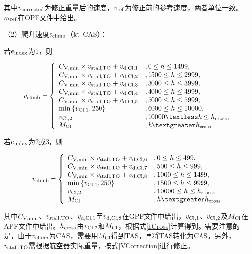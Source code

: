 \documentclass[a4paper,punct,space,heading=true,AutoFakeBold]{ctexrep}
\begin{document}
其中$v_{\rm corrected}$为修正重量后的速度，$v_{\rm ref}$为修正前的参考速度，两者单位一致。$m_{\rm ref}$在OPF文件中给出。


（2）爬升速度$v_{\rm climb}$（$\rm kt$ CAS）：

若$e_{\rm index}$为1，则

\begin{equation}
v_{\rm climb}=\left\{\begin{array}{ll}
C_{\rm V,min}\times v_{\rm stall,TO}+v_{\rm d,Cl,1}   &   , 0\leq h\leq 1499,\\
C_{\rm V,min}\times v_{\rm stall,TO}+v_{\rm d,Cl,2}   &   , 1500\leq h\leq 2999,\\
C_{\rm V,min}\times v_{\rm stall,TO}+v_{\rm d,Cl,3}   &   , 3000\leq h\leq 3999,\\
C_{\rm V,min}\times v_{\rm stall,TO}+v_{\rm d,Cl,4}   &   , 4000\leq h\leq 4999,\\
C_{\rm V,min}\times v_{\rm stall,TO}+v_{\rm d,Cl,5}   &   , 5000\leq h\leq 5999,\\
{\rm min}\left\{ v_{\rm Cl,1},250\right\}   &   , 6000\leq h\leq 10000,\\
v_{\rm Cl,2}   &   , 10000\textless h\leq h_{\rm cross},\\
M_{\rm Cl}   &   , h\textgreater h_{\rm cross}
\end{array}\right.
\end{equation}

若$e_{\rm index}$为2或3，则

\begin{equation}
v_{\rm climb}=\left\{\begin{array}{ll}
C_{\rm V,min}\times v_{\rm stall,TO}+v_{\rm d,Cl,6}   &   , 0\leq h\leq 499,\\
C_{\rm V,min}\times v_{\rm stall,TO}+v_{\rm d,Cl,7}   &   , 500\leq h\leq 999,\\
C_{\rm V,min}\times v_{\rm stall,TO}+v_{\rm d,Cl,8}   &   , 1000\leq h\leq 1499,\\
{\rm min}\left\{ v_{\rm Cl,1},250\right\}   &   , 1500\leq h\leq 9999,\\
v_{\rm Cl,2}   &   , 10000\leq h\leq h_{\rm cross},\\
M_{\rm Cl}   &   , h\textgreater h_{\rm cross}
\end{array}\right.
\end{equation}

其中$C_{\rm V,min}$、$v_{\rm stall,TO}$、$v_{\rm d,Cl,1}$至$v_{\rm d,Cl,8}$在GPF文件中给出，$v_{\rm Cl,1}$、$v_{\rm Cl,2}$及$M_{\rm Cl}$在APF文件中给出。$h_{\rm cross}$由$v_{\rm Cl,2}$和$M_{\rm Cl}$，根据式\ref{hCross}计算得到。需要注意的是，由于$v_{\rm climb}$为CAS，需要用$M_{\rm Cl}$得到TAS，再将TAS转化为CAS。另外，$v_{\rm stall,TO}$需根据航空器实际重量，按式\ref{VCorrection}进行修正。
\end{document}
